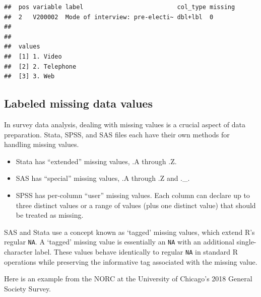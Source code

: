 \documentclass[
]{krantz}
\makeatletter
\newenvironment{Shaded}{\begin{snugshade}}{\end{snugshade}}
\newcommand{\CommentTok}[1]{\textcolor[rgb]{0.37,0.37,0.37}{\textit{#1}}}
\newcommand{\FunctionTok}[1]{\textcolor[rgb]{0.27,0.27,0.27}{\textbf{#1}}}
\newcommand{\NormalTok}[1]{#1}
\newcommand{\SpecialCharTok}[1]{\textcolor[rgb]{0.43,0.43,0.43}{\textbf{#1}}}
\providecommand{\tightlist}{%
  \setlength{\itemsep}{0pt}\setlength{\parskip}{0pt}}
\newenvironment{kframe}{%
\medskip{}
\setlength{\fboxsep}{.8em}
 \def\at@end@of@kframe{}%
 \ifinner\ifhmode%
  \def\at@end@of@kframe{\end{minipage}}%
  \begin{minipage}{\columnwidth}%
 \fi\fi%
 \def\FrameCommand##1{\hskip\@totalleftmargin \hskip-\fboxsep
 \colorbox{shadecolor}{##1}\hskip-\fboxsep
     \hskip-\linewidth \hskip-\@totalleftmargin \hskip\columnwidth}%
 \MakeFramed {\advance\hsize-\width
   \@totalleftmargin\z@ \linewidth\hsize
   \@setminipage}}%
 {\par\unskip\endMakeFramed%
 \at@end@of@kframe}
\renewenvironment{Shaded}{\begin{kframe}}{\end{kframe}}
\makeatother
\begin{document}
\begin{verbatim}
##  pos variable label                          col_type missing
##  2   V200002  Mode of interview: pre-electi~ dbl+lbl  0      
##                                                              
##                                                              
##  values          
##  [1] 1. Video    
##  [2] 2. Telephone
##  [3] 3. Web
\end{verbatim}

\hypertarget{labeled-missing-data-values}{%
\subsection{Labeled missing data values}\label{labeled-missing-data-values}}

In survey data analysis, dealing with missing values is a crucial aspect of data preparation. Stata, SPSS, and SAS files each have their own methods for handling missing values.

\begin{itemize}
\tightlist
\item
  Stata has ``extended'' missing values, .A through .Z.
\item
  SAS has ``special'' missing values, .A through .Z and .\_.
\item
  SPSS has per-column ``user'' missing values. Each column can declare up to three distinct values or a range of values (plus one distinct value) that should be treated as missing.
\end{itemize}

SAS and Stata use a concept known as `tagged' missing values, which extend R's regular \texttt{NA}. A `tagged' missing value is essentially an \texttt{NA} with an additional single-character label. These values behave identically to regular \texttt{NA} in standard R operations while preserving the informative tag associated with the missing value.

Here is an example from the NORC at the University of Chicago's 2018 General Society Survey.

\begin{Shaded}
\end{Shaded}
\end{document}
